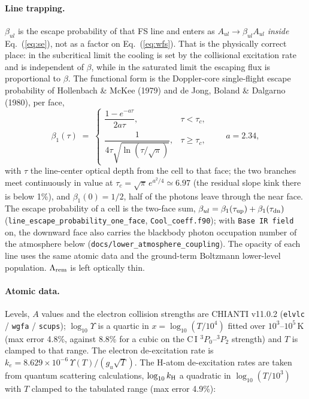 \documentclass[english,a4paper]{my_memo}
\begin{document}
\paragraph{Line trapping.}  $\beta_{ul}$ is the escape probability of
that FS line and enters as $A_{ul}\to\beta_{ul}A_{ul}$ \emph{inside}
Eq.~(\ref{eq:se}), not as a factor on Eq.~(\ref{eq:wfs}).  That is the
physically correct place: in the subcritical limit the cooling is set by
the collisional excitation rate and is independent of $\beta$, while in
the saturated limit the escaping flux is proportional to $\beta$.
The functional form is the Doppler-core single-flight escape probability
of Hollenbach \& McKee (1979) and de Jong, Boland \& Dalgarno (1980),
per face,
\begin{equation}
\beta_1(\tau) \;=\;
\begin{cases}
  \dfrac{1-e^{-a\tau}}{2a\tau}, & \tau < \tau_c,\\[8pt]
  \dfrac{1}{4\tau\sqrt{\ln\!\left(\tau/\sqrt{\pi}\right)}}, & \tau \ge \tau_c,
\end{cases}
\qquad a = 2.34,
\label{eq:beta1}
\end{equation}
with $\tau$ the line-center optical depth from the cell to that face;
the two branches meet continuously in value at
$\tau_c=\sqrt{\pi}\,e^{a^2/4}\simeq 6.97$ (the residual slope kink there
is below 1\%), and $\beta_1(0)=1/2$, half of the photons leave through
the near face.  The escape probability of a cell is the two-face sum,
$\beta_{ul}=\beta_1(\tau_{\rm up})+\beta_1(\tau_{\rm dn})$
(\texttt{line\_escape\_probability\_one\_face},
\texttt{Cool\_coeff.f90}); with \texttt{Base IR field} on, the downward
face also carries the blackbody photon occupation number of the
atmosphere below (\texttt{docs/lower\_atmosphere\_coupling}).  The
opacity of each line uses the same atomic data and the ground-term
Boltzmann lower-level population.  $\Lambda_{\rm rem}$ is left optically
thin.

\paragraph{Atomic data.}  Levels, $A$ values and the electron collision
strengths are CHIANTI v11.0.2 (\texttt{elvlc} / \texttt{wgfa} /
\texttt{scups}); $\log_{10}\Upsilon$ is a quartic in
$x=\log_{10}(T/10^4)$ fitted over $10^3$--$10^5$\,K (max error 4.8\%,
against 8.8\% for a cubic on the C\,I $^3P_0$--$^3P_2$ strength) and
$T$ is clamped to that range.  The electron de-excitation rate is
$k_e = 8.629\times10^{-6}\,\Upsilon(T)/(g_u\sqrt T)$.  The H-atom
de-excitation rates are taken from quantum scattering calculations,
$\log_{10}k_{\rm H}$ a quadratic in $\log_{10}(T/10^3)$ with $T$ clamped
to the tabulated range (max error 4.9\%):
\end{document}
